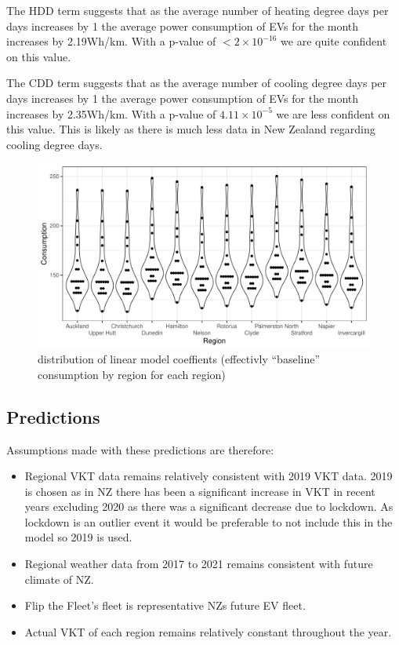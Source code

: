 \documentclass[
]{article}
\begin{document}
The HDD term suggests that as the average number of heating degree days
per days increases by 1 the average power consumption of EVs for the
month increases by 2.19Wh/km. With a p-value of \(<2\times10^{-16}\) we
are quite confident on this value.

The CDD term suggests that as the average number of cooling degree days
per days increases by 1 the average power consumption of EVs for the
month increases by 2.35Wh/km. With a p-value of \(4.11\times10^{-5}\) we
are less confident on this value. This is likely as there is much less
data in New Zealand regarding cooling degree days.

\begin{figure}
\centering
\includegraphics{final_report_files/figure-latex/consum_den-1.pdf}
\caption{distribution of linear model coeffients (effectivly
``baseline'' consumption by region for each
region)\label{fig:consum_den}}
\end{figure}

\hypertarget{predictions}{%
\subsection{Predictions}\label{predictions}}

Assumptions made with these predictions are therefore:

\begin{itemize}
\item Regional VKT data remains relatively consistent with 2019 VKT data. 2019 is chosen as in NZ there has been a significant increase in VKT in recent years excluding 2020 as there was a significant decrease due to lockdown. As lockdown is an outlier event it would be preferable to not include this in the model so 2019 is used.
\item Regional weather data from 2017 to 2021 remains consistent with future climate of NZ.
\item Flip the Fleet's fleet is representative NZs future EV fleet.
\item Actual VKT of each region remains relatively constant throughout the year.
\end{itemize}
\end{document}

